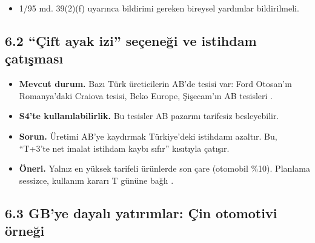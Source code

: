 \begin{itemize}
\begin{itemize}
    \begin{itemize}
    \tightlist
    \item
      Çıkıştan sonra S2'nin eşit rekabet koşulları faslı bunu zaten isteyecek.
    \item
      6015'in uygulamaya konması bugün hem AB'nin talebini karşılar hem ITA müzakeresine hazırlıktır. Bu pişmanlıksız bir hamle (H-Y2).
    \end{itemize}
  \item
    1/95 md. 39(2)(f) uyarınca bildirimi gereken bireysel yardımlar bildirilmeli.
  \end{itemize}
\end{itemize}

\hypertarget{02c_hazirlik-62-uxe7ift-ayak-izi-seuxe7eneux11fi-ve-istihdam-uxe7atux131ux15fmasux131}{%
\subsection{6.2 ``Çift ayak izi'' seçeneği ve istihdam çatışması}\label{02c_hazirlik-62-uxe7ift-ayak-izi-seuxe7eneux11fi-ve-istihdam-uxe7atux131ux15fmasux131}}

\begin{itemize}
\tightlist
\item
  \textbf{Mevcut durum.} Bazı Türk üreticilerin AB'de tesisi var: Ford Otosan'ın Romanya'daki Craiova tesisi, Beko Europe, Şişecam'ın AB tesisleri \etiketD{}.
\item
  \textbf{S4'te kullanılabilirlik.} Bu tesisler AB pazarını tarifesiz besleyebilir.
\item
  \textbf{Sorun.} Üretimi AB'ye kaydırmak Türkiye'deki istihdamı azaltır. Bu, ``T+3'te net imalat istihdam kaybı sıfır'' kısıtıyla çatışır.
\item
  \textbf{Öneri.} Yalnız en yüksek tarifeli ürünlerde son çare (otomobil \%10). Planlama sessizce, kullanım kararı T gününe bağlı \etiketH{}.
\end{itemize}

\hypertarget{02c_hazirlik-63-gbye-dayalux131-yatux131rux131mlar-uxe7in-otomotivi-uxf6rneux11fi}{%
\subsection{6.3 GB'ye dayalı yatırımlar: Çin otomotivi örneği}\label{02c_hazirlik-63-gbye-dayalux131-yatux131rux131mlar-uxe7in-otomotivi-uxf6rneux11fi}}


